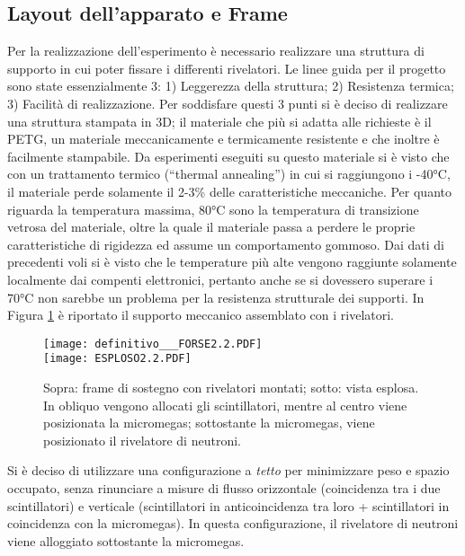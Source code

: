 \subsection{Layout dell'apparato e Frame}

Per la realizzazione dell’esperimento è necessario realizzare una struttura di supporto in cui poter fissare i differenti rivelatori. Le linee guida per il progetto sono state essenzialmente 3: 1) Leggerezza della struttura; 2) Resistenza termica; 3) Facilità di realizzazione. Per soddisfare questi 3 punti si è deciso di realizzare una struttura stampata in 3D; il materiale che più si adatta alle richieste è il PETG, un materiale meccanicamente e termicamente resistente e che inoltre è facilmente stampabile. 
Da esperimenti eseguiti su questo materiale si è visto che con un trattamento termico (“thermal annealing”) in cui si raggiungono i -40°C, il materiale perde solamente il 2-3\% delle caratteristiche meccaniche. Per quanto riguarda la temperatura massima, 80°C sono la temperatura di transizione vetrosa del materiale, oltre la quale il materiale passa a perdere le proprie caratteristiche di rigidezza ed assume un comportamento gommoso. Dai dati di precedenti voli si è visto che le temperature più alte vengono raggiunte solamente localmente dai compenti elettronici, pertanto anche se si dovessero superare i 70°C non sarebbe un problema per la resistenza strutturale dei supporti. 
In Figura \ref{frame} è riportato il supporto meccanico assemblato con i rivelatori.
\begin{figure}
    
    \texttt{[image: definitivo\_\_\_FORSE2.2.PDF]}
    \\
    \texttt{[image: ESPLOSO2.2.PDF]}

    \caption{Sopra: frame di sostegno con rivelatori montati; sotto: vista esplosa. In obliquo vengono allocati gli scintillatori, mentre al centro viene posizionata la micromegas; sottostante la micromegas, viene posizionato il rivelatore di neutroni.}
    \label{frame}
\end{figure}
Si è deciso di utilizzare una configurazione a \emph{tetto} per minimizzare peso e spazio occupato, senza rinunciare a misure di flusso orizzontale (coincidenza tra i due scintillatori) e verticale (scintillatori in anticoincidenza tra loro + scintillatori in coincidenza con la micromegas).
In questa configurazione, il rivelatore di neutroni viene alloggiato sottostante la micromegas. 